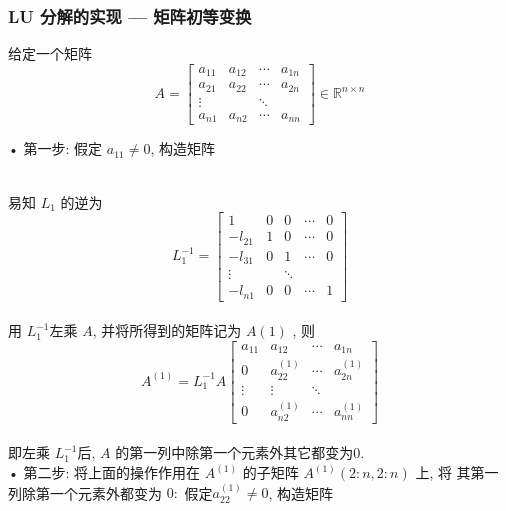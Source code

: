 \documentclass[12pt,a4paper]{article}
\begin{document}
\newpage
\subsubsection{LU 分解的实现 — 矩阵初等变换}
给定一个矩阵
\begin{equation*}
	A=\left[\begin{array}{cccc}{a_{11}} & {a_{12}} & {\cdots} & {a_{1 n}} \\ {a_{21}} & {a_{22}} & {\cdots} & {a_{2 n}} \\ {\vdots} & {} & {\ddots} & {} \\ {a_{n 1}} & {a_{n 2}} & {\cdots} & {a_{n n}}\end{array}\right] \in \mathbb{R}^{n \times n}
\end{equation*}

• 第一步: 假定 $a_{11} \neq  0$, 构造矩阵

\\
易知 $L_1$ 的逆为
$$
L_{1}^{-1}=\left[\begin{array}{ccccc}{1} & {0} & {0} & {\cdots} & {0} \\ {-l_{21}} & {1} & {0} & {\cdots} & {0} \\ {-l_{31}} & {0} & {1} & {\cdots} & {0} \\ {\vdots} & {} & {\ddots} & {} \\ {-l_{n 1}} & {0} & {0} & {\cdots} & {1}\end{array}\right]
$$
\\
用 $L^{−1}_1 $左乘 $A$, 并将所得到的矩阵记为 $A(1)$
, 则
$$
A^{(1)}=L_{1}^{-1} A\left[\begin{array}{cccc}{a_{11}} & {a_{12}} & {\cdots} & {a_{1 n}} \\ {0} & {a_{22}^{(1)}} & {\cdots} & {a_{2 n}^{(1)}} \\ {\vdots} & {\vdots} & {\ddots} & {} \\ {0} & {a_{n 2}^{(1)}} & {\cdots} & {a_{n n}^{(1)}}\end{array}\right]
$$
\\
即左乘 $L^{−1}_1 $后, $A$ 的第一列中除第一个元素外其它都变为$ 0$.
\\
• 第二步: 将上面的操作作用在 $A^{(1)}$ 的子矩阵 $A^{(1)}(2 : n, 2 : n)$ 上, 将
其第一列除第一个元素外都变为 $0:$ 假定$ a^{(1)}_{22} \neq 0$, 构造矩阵
\end{document}
